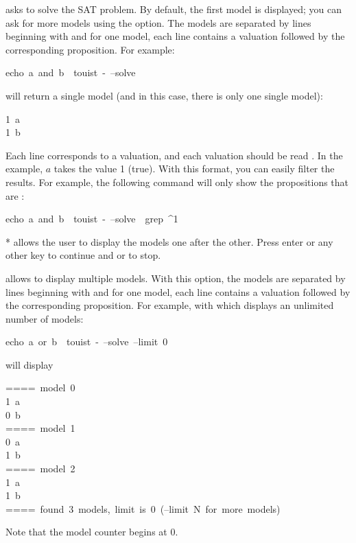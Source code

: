 \textbf{} asks  to solve the SAT problem. By default, the first
model is displayed; you can ask for more models using the 
option. The models are separated by lines beginning with \mdcode{====} and for
one model, each line contains a valuation followed by the corresponding
proposition. For example:%
\begin{mdpre}%
\noindent{}echo~a~and~b~\textbar{}~touist~-~--solve%
\end{mdpre}\noindent will return a single model (and in this case, there is only one single model):
\begin{mdpre}%
\noindent{}1~a\\
1~b%
\end{mdpre}\noindent Each line corresponds to a valuation, and each valuation should be read
. In the example, $a$ takes the value 1 (true).
With this format, you can easily filter the results. For example,
the following command will only show the propositions that are :
\begin{mdpre}%
\noindent{}echo~a~and~b~\textbar{}~touist~-~--solve~\textbar{}~grep~\textasciicircum{}1%
\end{mdpre}\noindent** allows the user to display the models one after
the other. Press enter or any other key to continue and  or  to stop.

\textbf{} allows to display multiple models. With this option,
the models are separated by lines beginning with \mdcode{====} and for one model,
each line contains a valuation followed by the corresponding proposition.
For example, with  which displays an unlimited number of models:%
\begin{mdpre}%
\noindent{}echo~a~or~b~\textbar{}~touist~-~--solve~--limit~0%
\end{mdpre}\noindent will display
\begin{mdpre}%
\noindent{}====~model~0\\
1~a\\
0~b\\
====~model~1\\
0~a\\
1~b\\
====~model~2\\
1~a\\
1~b\\
====~found~3~models,~limit~is~0~(--limit~N~for~more~models)%
\end{mdpre}\noindent Note that the model counter begins at 0.

